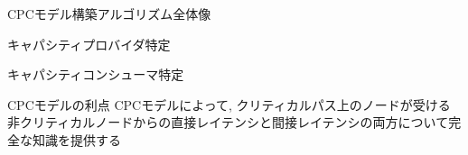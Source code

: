 \begin{frame}[label=alg1]{CPCモデル構築アルゴリズム全体像}
\end{frame}

\begin{frame}{キャパシティプロバイダ特定}
\end{frame}

\begin{frame}{キャパシティコンシューマ特定}
\end{frame}

\begin{frame}{CPCモデルの利点}
    CPCモデルによって, クリティカルパス上のノードが受ける非クリティカルノードからの直接レイテンシと間接レイテンシの両方について完全な知識を提供する
\end{frame}



